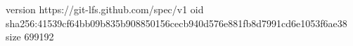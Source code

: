 version https://git-lfs.github.com/spec/v1
oid sha256:41539cf64bb09b835b908850156cecb940d576e881fb8d7991cd6e1053f6ae38
size 699192
